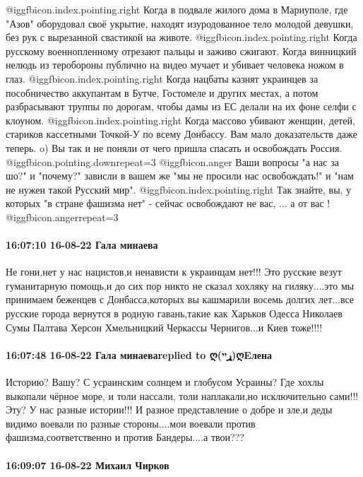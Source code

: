  @igg{fbicon.index.pointing.right} Когда в подвале жилого дома в Мариуполе, где "Азов" оборудовал своё укрытие, находят изуродованное тело молодой девушки, без рук с вырезанной свастикой на животе.
 @igg{fbicon.index.pointing.right} Когда русскому военнопленному отрезают пальцы и заживо сжигают. Когда винницкий нелюдь из теробороны публично на видео мучает и убивает человека ножом в глаз.
 @igg{fbicon.index.pointing.right} Когда нацбаты казнят украинцев за пособничество аккупантам в Бутче, Гостомеле и других местах, а потом разбрасывают труппы по дорогам, чтобы дамы из ЕС делали на их фоне селфи с клоуном.
 @igg{fbicon.index.pointing.right} Когда массово убивают женщин, детей, стариков кассетными Точкой-У по всему Донбассу.
Вам мало доказательств даже теперь.
o) Вы так и не поняли от чего пришла спасать и освобождать Россия.
 @igg{fbicon.pointing.down}{repeat=3}  @igg{fbicon.anger} 
Ваши вопросы "а нас за шо?" и "почему?" зависли в вашем же "мы не просили нас освобождать!" и "нам не нужен такой Русский мир".
 @igg{fbicon.index.pointing.right} Так знайте, вы, у которых "в стране фашизма нет"
- сейчас освобождают не вас, ... а от вас ! ️  @igg{fbicon.anger}{repeat=3} 

\paragraph{16:07:10 16-08-22 Гала минаева}

Не гони,нет у нас нацистов,и ненависти к украинцам нет!!! Это русские везут
гуманитарную помощь,и до сих пор никто не сказал хохляку на гиляку....это мы
принимаем беженцев с Донбасса,которых вы кашмарили восемь долгих лет...все
русские города вернутся в родную гавань,такие как Харьков Одесса Николаев Сумы
Палтава Херсон Хмельницкий Черкассы Чернигов...и Киев тоже!!!!

\paragraph{16:07:48 16-08-22 Гала минаеваreplied to ღ(ړײ)ღEлена}

Историю? Вашу? С усраинским солнцем и глобусом Усраины? Где хохлы выкопали
чёрное море, и толи нассали, толи наплакали,но исключительно сами!!! Эту? У нас
разные истории!!! И разное представление о добре и зле,и деды видимо воевали по
разные стороны....мои воевали против фашизма,соответственно и против
Бандеры....а твои???

\paragraph{16:09:07 16-08-22 Михаил Чирков}

